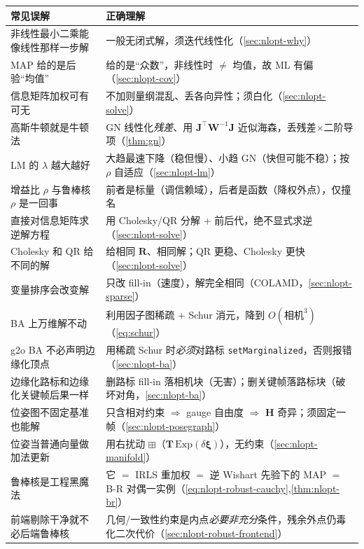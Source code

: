 \begin{table}[H]\centering\small
\begin{tabular}{p{} p{}}
\toprule
\textbf{常见误解} & \textbf{正确理解} \\
\midrule
非线性最小二乘能像线性那样一步解 & 一般无闭式解，须迭代线性化（\cref{sec:nlopt-why}）\\
MAP 给的是后验“均值” & 给的是“众数”，非线性时 $\ne$ 均值，故 ML 有偏（\cref{sec:nlopt-cov}）\\
信息矩阵加权可有可无 & 不加则量纲混乱、丢各向异性；须白化（\cref{sec:nlopt-solve}）\\
高斯牛顿就是牛顿法 & GN 线性化\emph{残差}、用 $\mathbf{J}^\top\mathbf{W}^{-1}\mathbf{J}$ 近似海森，丢残差$\times$二阶导项（\cref{thm:gn}）\\
LM 的 $\lambda$ 越大越好 & 大趋最速下降（稳但慢）、小趋 GN（快但可能不稳）；按 $\rho$ 自适应（\cref{sec:nlopt-lm}）\\
增益比 $\rho$ 与鲁棒核 $\rho$ 是一回事 & 前者是标量（调信赖域），后者是函数（降权外点），仅撞名 \\
直接对信息矩阵求逆解方程 & 用 Cholesky/QR 分解 $+$ 前后代，绝不显式求逆（\cref{sec:nlopt-solve}）\\
Cholesky 和 QR 给不同的解 & 给相同 $\mathbf{R}$、相同解；QR 更稳、Cholesky 更快（\cref{sec:nlopt-solve}）\\
变量排序会改变解 & 只改 fill-in（速度），解完全相同（COLAMD，\cref{sec:nlopt-sparse}）\\
BA 上万维解不动 & 利用因子图稀疏 $+$ Schur 消元，降到 $O(\text{相机}^3)$（\cref{eq:schur}）\\
g2o BA 不必声明边缘化顶点 & 用稀疏 Schur 时\emph{必须}对路标 \texttt{setMarginalized}，否则报错（\cref{sec:nlopt-ba}）\\
边缘化路标和边缘化关键帧后果一样 & 删路标 fill-in 落相机块（无害）；删关键帧落路标块（破坏对角，\cref{sec:nlopt-ba}）\\
位姿图不固定基准也能解 & 只含相对约束 $\Rightarrow$ gauge 自由度 $\Rightarrow$ $\mathbf{H}$ 奇异；须固定一帧（\cref{sec:nlopt-posegraph}）\\
位姿当普通向量做加法更新 & 用右扰动 $\boxplus$（$\mathbf{T}\,\mathrm{Exp}(\delta\boldsymbol{\xi})$），无约束（\cref{sec:nlopt-manifold}）\\
鲁棒核是工程黑魔法 & 它 $=$ IRLS 重加权 $=$ 逆 Wishart 先验下的 MAP $=$ B-R 对偶一实例（\cref{eq:nlopt-robust-cauchy},\cref{thm:nlopt-br}）\\
前端剔除干净就不必后端鲁棒核 & 几何/一致性约束是内点\emph{必要非充分}条件，残余外点仍毒化二次代价（\cref{sec:nlopt-robust-frontend}）\\

\end{tabular}
\end{table}
